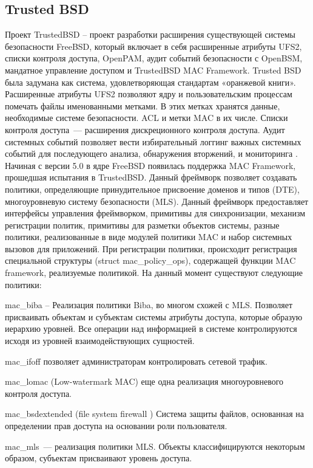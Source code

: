 \subsection{Trusted BSD} 

Проект TrustedBSD – проект разработки 
расширения существующей системы 
безопасности FreeBSD, который включает 
в себя  расширенные атрибуты UFS2, 
списки контроля доступа, OpenPAM, аудит событий 
безопасности с OpenBSM, мандатное управление доступом 
и TrustedBSD MAC Framework. Trusted BSD была задумана 
как система, удовлетворяющая стандартам «оранжевой книги». 
Расширенные атрибуты UFS2 позволяют ядру и 
пользовательским процессам помечать файлы 
именованными метками. В этих метках
хранятся данные, необходимые системе безопасности. 
ACL и метки MAC в их числе. Списки контроля доступа~--- 
 расширения дискреционного контроля доступа. Аудит 
системных событий позволяет вести избирательный 
логгинг важных системных событий для последующего 
анализа, обнаружения вторжений, и мониторинга  
. Начиная с версии 5.0 в ядре FreeBSD 
появилась поддержка MAC Framework, прошедшая испытания 
в TrustedBSD. Данный фреймворк позволяет создавать политики, 
определяющие принудительное присвоение доменов и типов (DTE), 
многоуровневую систему безопасности (MLS). Данный фреймворк 
предоставляет интерфейсы управления фреймворком, примитивы 
для синхронизации, механизм регистрации политик, примитивы 
для разметки объектов системы, разные политики, 
реализованные в виде модулей политики MAC и набор 
системных вызовов для приложений. При регистрации 
политики, происходит регистрация специальной структуры 
(struct mac\_policy\_ops), содержащей функции MAC 
framework, реализуемые политикой. На данный момент 
существуют следующие политики: 

mac\_biba – Реализация политики Biba, во многом 
схожей с MLS. Позволяет присваивать объектам и 
субъектам системы атрибуты доступа, которые образую 
иерархию уровней. Все операции над информацией в 
системе контролируются исходя из уровней 
взаимодействующих сущностей. 

mac\_ifoff позволяет администраторам контролировать 
сетевой трафик. 

mac\_lomac (Low-watermark MAC) еще одна 
реализация многоуровневого контроля доступа. 

mac\_bsdextended (file system firewall ) Система 
защиты файлов, основанная на определении прав 
доступа на основании роли пользователя. 

mac\_mls~--- реализация политики MLS. Объекты 
классифицируются  некоторым образом, субъектам 
присваивают уровень доступа. 

